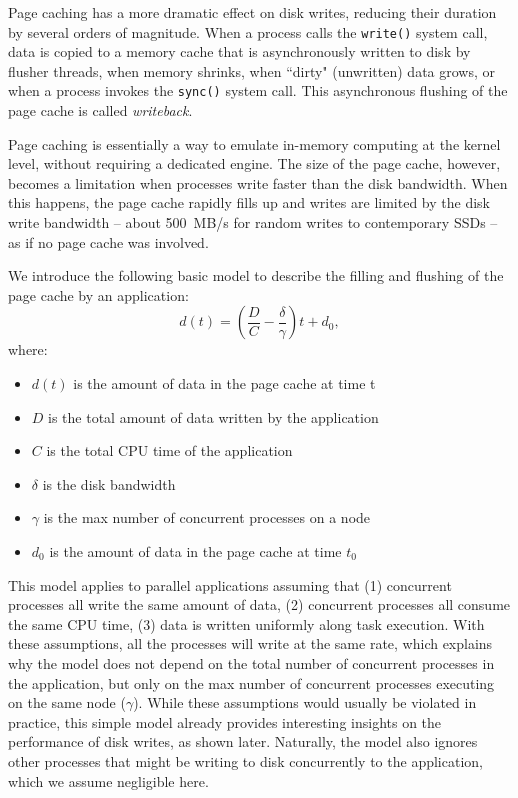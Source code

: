 \documentclass{IEEEtran}
\begin{document}
Page caching has a more dramatic effect on disk writes, reducing their 
duration by several orders of magnitude. When a process calls the 
\texttt{write()} system call, data is copied to a memory cache that is 
asynchronously written to disk by flusher threads, when memory shrinks, when
``dirty" (unwritten) data grows, or when a 
process invokes the \texttt{sync()} system call. 
This asynchronous flushing of the page cache is called 
\emph{writeback}.

Page caching is essentially a way to 
emulate in-memory computing at the kernel level, without requiring a 
dedicated engine. The size of the page cache, however, becomes a 
limitation when processes write faster than the disk bandwidth. When 
this happens, the page cache rapidly fills up and writes are limited by 
the disk write bandwidth -- about 500~MB/s for random writes to 
contemporary SSDs  -- as if no page cache was involved.

We introduce the following basic model to describe the filling and 
flushing of the page cache by an application:
$$
d(t) = \left( \frac{D}{C} - \frac{\delta}{\gamma} \right)t + d_0,
$$
where:
\begin{itemize}
\item $d(t)$ is the amount of data in the page cache at time t
\item $D$ is the total amount of data written by the application
\item $C$ is the total CPU time of the application
\item $\delta$ is the disk bandwidth
\item $\gamma$ is the max number of concurrent processes on a node
\item $d_0$ is the amount of data in the page cache at time $t_0$
\end{itemize}

This model applies to parallel applications assuming that (1) 
concurrent processes all write the same amount of data, (2) 
concurrent processes all consume the same CPU time, (3) data is written 
uniformly along task execution. With these assumptions, all the 
processes will write at the same rate, which explains why the model 
does not depend on the total number of concurrent processes in the 
application, but only on the max number of concurrent processes 
executing on the same node ($\gamma$). While these 
assumptions would usually be violated in practice, this simple 
model already provides interesting insights on the performance of disk 
writes, as shown later. Naturally, the model also ignores other 
processes that might be writing to disk concurrently to the 
application, which we assume negligible here. 
\end{document}
